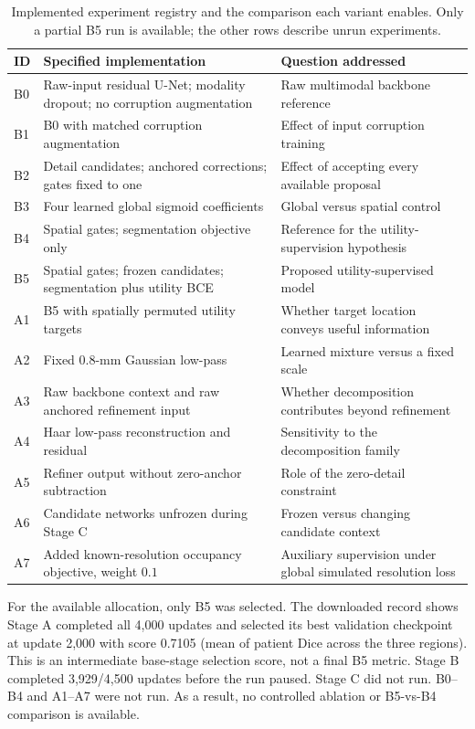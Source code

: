\documentclass[conference]{IEEEtran}
\begin{document}
\begin{table}[!t]
\caption{Implemented experiment registry and the comparison each variant enables. Only a partial B5 run is available; the other rows describe unrun experiments.}
\label{tab:ablationdesign}
\centering
\begin{tabularx}{\textwidth}{@{}l L L@{}}
\toprule
ID & Specified implementation & Question addressed \\
\midrule
B0 & Raw-input residual U-Net; modality dropout; no corruption augmentation & Raw multimodal backbone reference \\
B1 & B0 with matched corruption augmentation & Effect of input corruption training \\
B2 & Detail candidates; anchored corrections; gates fixed to one & Effect of accepting every available proposal \\
B3 & Four learned global sigmoid coefficients & Global versus spatial control \\
B4 & Spatial gates; segmentation objective only & Reference for the utility-supervision hypothesis \\
B5 & Spatial gates; frozen candidates; segmentation plus utility BCE & Proposed utility-supervised model \\
A1 & B5 with spatially permuted utility targets & Whether target location conveys useful information \\
A2 & Fixed $0.8$-mm Gaussian low-pass & Learned mixture versus a fixed scale \\
A3 & Raw backbone context and raw anchored refinement input & Whether decomposition contributes beyond refinement \\
A4 & Haar low-pass reconstruction and residual & Sensitivity to the decomposition family \\
A5 & Refiner output without zero-anchor subtraction & Role of the zero-detail constraint \\
A6 & Candidate networks unfrozen during Stage C & Frozen versus changing candidate context \\
A7 & Added known-resolution occupancy objective, weight $0.1$ & Auxiliary supervision under global simulated resolution loss \\
\bottomrule
\end{tabularx}
\end{table}

For the available allocation, only B5 was selected. The downloaded record shows Stage A completed all 4,000 updates and selected its best validation checkpoint at update 2,000 with score 0.7105 (mean of patient Dice across the three regions). This is an intermediate base-stage selection score, not a final B5 metric. Stage B completed 3,929/4,500 updates before the run paused. Stage C did not run. B0--B4 and A1--A7 were not run. As a result, no controlled ablation or B5-vs-B4 comparison is available.
\end{document}
